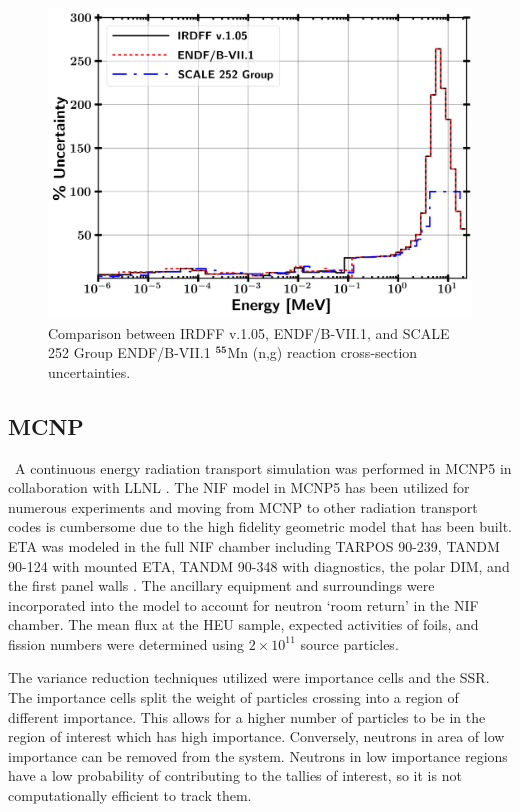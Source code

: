 \begin{figure}[hbt!]
	\includegraphics[width=13cm]{Figures/Chapter3/Mn_ng_Uncertainty.png}
	\caption[Comparison between IRDFF v.1.05, ENDF/B-VII.1, and SCALE 252 Group ENDF/B-VII.1 $\mathrm{^{55}}$Mn (n,g) reaction cross-section uncertainties.]{Comparison between IRDFF v.1.05, ENDF/B-VII.1, and SCALE 252 Group ENDF/B-VII.1 $\mathbf{^{55}}$Mn (n,g) reaction cross-section uncertainties.}
	\label{fig:mnng}
\end{figure}

\subsection{MCNP}

\ A continuous energy radiation transport simulation was performed in MCNP5 in collaboration with LLNL  \cite{MCNP5}. 
The NIF model in MCNP5 has been utilized for numerous experiments and moving from MCNP to other radiation transport codes is cumbersome due to the high fidelity geometric model that has been built. 
ETA was modeled in the full NIF chamber including TARPOS 90-239, TANDM 90-124 with mounted ETA, TANDM 90-348 with diagnostics, the polar DIM, and the first panel walls \cite{NIF_Overview2}. 
The ancillary equipment and surroundings were incorporated into the model to account for neutron `room return' in the NIF chamber.
The mean flux at the HEU sample, expected activities of foils, and fission numbers were determined using $2\times10^{11}$ source particles. 

The variance reduction techniques utilized were importance cells and the SSR.
The importance cells split the weight of particles crossing into a region of different importance. This allows for a higher number of particles to be in the region of interest which has high importance. 
Conversely, neutrons in area of low importance can be removed from the system. Neutrons in low importance regions have a low probability of contributing to the tallies of interest, so it is not computationally efficient to track them. 

